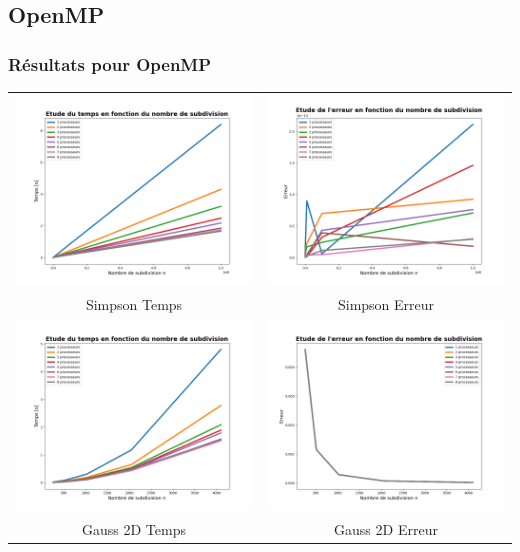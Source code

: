 \documentclass[10pt]{beamer}
\begin{document}
\subsection{OpenMP}

\begin{frame}
    \frametitle{Résultats pour OpenMP}
        \small
    \begin{tabular}{cc}
        \includegraphics[width=0.45\linewidth]{Images/time_simp_Op_MP.png} &
        \includegraphics[width=0.45\linewidth]{Images/error_simp_Op_MP.png} \\
        Simpson Temps & Simpson Erreur \\
        \includegraphics[width=0.45\linewidth]{Images/time_gauss_Op_MP.png} &
        \includegraphics[width=0.45\linewidth]{Images/error_gauss_Op_MP.png} \\
        Gauss 2D Temps & Gauss 2D Erreur \\
    \end{tabular}
        
\end{frame}
\end{document}
